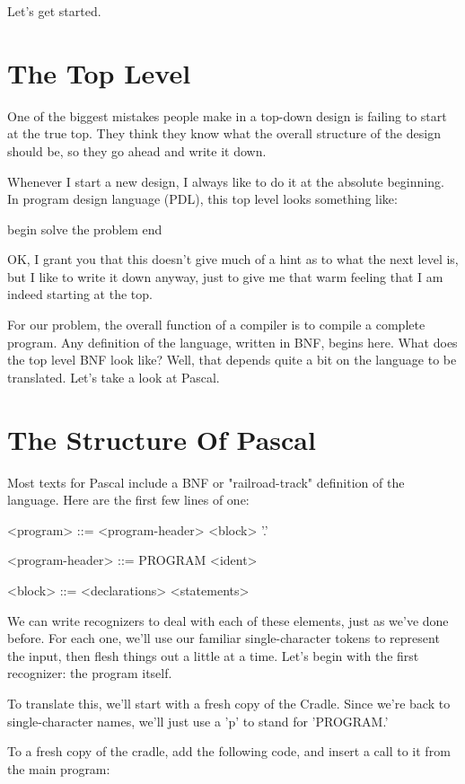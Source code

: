 \documentclass[float=false, crop=false]{standalone}
\begin{document}
Let's get started.

\section{The Top Level}

One of the biggest mistakes people make in a top-down design is failing to start
at the true top. They think they know what the overall structure of the design
should be, so they go ahead and write it down.

Whenever I start a new design, I always like to do it at the absolute beginning.
In program design language (PDL), this top level looks something like:


     begin
        solve the problem
     end


OK, I grant you that this doesn't give much of a hint as to what the next level
is, but I like to write it down anyway, just to give me that warm feeling that I
am indeed starting at the top.

For our problem, the overall function of a compiler is to compile a complete
program. Any definition of the language, written in BNF, begins here. What does
the top level BNF look like? Well, that depends quite a bit on the language to
be translated. Let's take a look at Pascal.


\section{The Structure Of Pascal}

Most texts for Pascal include a BNF or "railroad-track" definition of the
language. Here are the first few lines of one:


     <program> ::= <program-header> <block> '.'

     <program-header> ::= PROGRAM <ident>

     <block> ::= <declarations> <statements>


We can write recognizers to deal with each of these elements, just as we've done
before. For each one, we'll use our familiar single-character tokens to
represent the input, then flesh things out a little at a time. Let's begin with
the first recognizer: the program itself.

To translate this, we'll start with a fresh copy of the Cradle. Since we're back
to single-character names, we'll just use a 'p' to stand for 'PROGRAM.'

To a fresh copy of the cradle, add the following code, and insert a call to it
from the main program:
\end{document}
